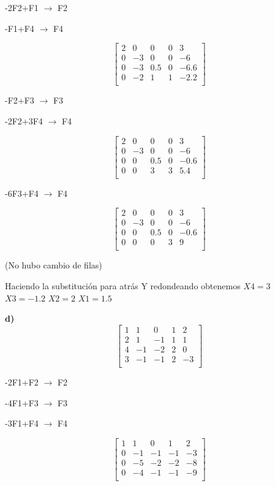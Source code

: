 \documentclass[12pt]{article}
\begin{document}
-2F2+F1 $\longrightarrow $ F2

-F1+F4 $\longrightarrow $ F4

\[
\begin{bmatrix}
2 & 0 & 0 & 0 & 3 \\
0 & -3 & 0& 0& -6 \\
0 & -3 & 0.5 & 0 & -6.6 \\
0 & -2 & 1 & 1 & -2.2 \\
\end{bmatrix}
\]

-F2+F3 $\longrightarrow $ F3

-2F2+3F4 $\longrightarrow $ F4

\[
\begin{bmatrix}
2 & 0 & 0 & 0 & 3 \\
0 & -3 & 0& 0& -6 \\
0 & 0 & 0.5 & 0 & -0.6 \\
0 & 0 & 3 & 3 & 5.4 \\
\end{bmatrix}
\]

-6F3+F4 $\longrightarrow $ F4

\[
\begin{bmatrix}
2 & 0 & 0 & 0 & 3 \\
0 & -3 & 0& 0& -6 \\
0 & 0 & 0.5 & 0 & -0.6 \\
0 & 0 & 0 & 3 & 9 \\
\end{bmatrix}
\]

(No hubo cambio de filas)

Haciendo la substitución para atrás Y redondeando obtenemos
$X4 = 3$   $X3 = -1.2$   $X2 =2$  $X1 =1.5$ 

\textbf{d)}
\[
\begin{bmatrix}
1 & 1 & 0 & 1 & 2 \\
2 & 1 & -1& 1& 1 \\
4 & -1 & -2 & 2 & 0 \\
3 & -1 & -1 & 2 & -3 \\
\end{bmatrix}
\]

-2F1+F2 $\longrightarrow $ F2

-4F1+F3 $\longrightarrow $ F3

-3F1+F4 $\longrightarrow $ F4

\[
\begin{bmatrix}
1 & 1 & 0 & 1 & 2 \\
0 & -1 & -1& -1& -3 \\
0 & -5 & -2 & -2 & -8 \\
0 & -4 & -1 & -1 & -9 \\
\end{bmatrix}
\]
\end{document}
